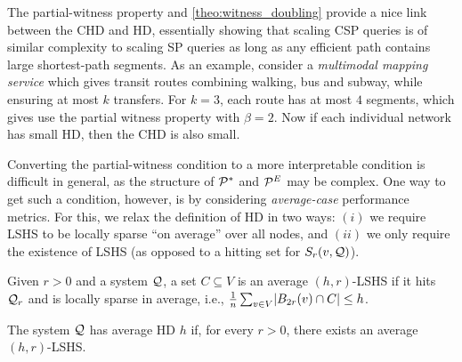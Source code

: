 The partial-witness property and \cref{theo:witness_doubling} provide a nice link between the CHD and HD, essentially showing that scaling CSP queries is of similar complexity to scaling SP queries as long as any efficient path contains large shortest-path segments. 
As an example, consider a \emph{multimodal mapping service} which gives transit routes combining walking, bus and subway, while ensuring at most $k$ transfers. 
For $k=3$, each route has at most $4$ segments, which gives use the partial witness property with $\beta = 2$. 
Now if each individual network has small HD, then the CHD is also small.

Converting the partial-witness condition to a more interpretable condition is difficult in general, as the structure of $\mathcal{P}^*$ and $\mathcal{P}^E$ may be complex. 
One way to get such a condition, however, is by considering \emph{average-case} performance metrics.
For this, we relax the definition of HD in two ways: $(i)$ we require LSHS to be locally sparse ``on average'' over all nodes, and
$(ii)$ we only require the existence of LSHS (as opposed to a hitting set for $S_r(v,\mathcal{Q})$).

\begin{definition}
Given $r>0$ and a system $\mathcal{Q}$, a set $C\subseteq V$ is an average $(h,r)$-LSHS if it hits $\mathcal{Q}_r$ and is locally sparse in average, i.e.,
$\frac{1}{n}\sum_{v\in V} \lvert B_{2r}(v)\cap C\rvert \leq h$.
\end{definition}
\begin{definition}[Average HD]
The system $\mathcal{Q}$ has average HD $h$ if, for every $r>0$, there exists an average $(h,r)$-LSHS.
\end{definition}

